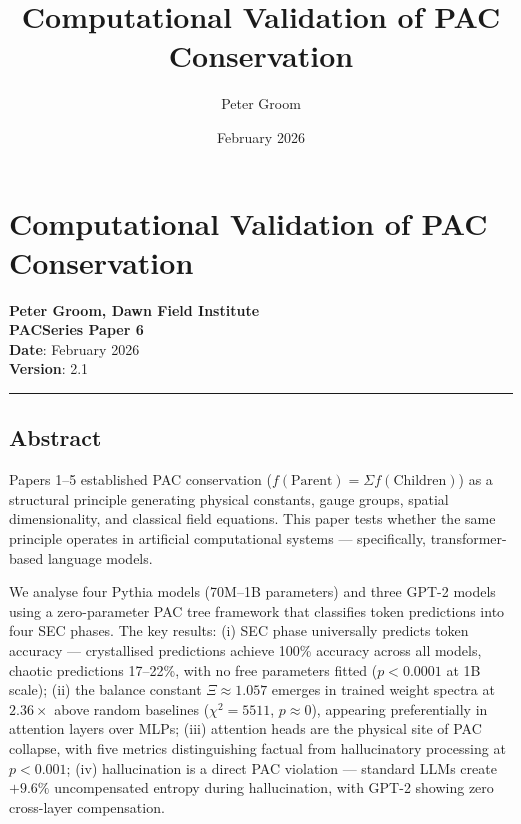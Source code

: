 \documentclass[
  11pt,
  a4paper]{article}
\title{Computational Validation of PAC Conservation}
\author{Peter Groom}
\date{February 2026}
\begin{document}
\maketitle

\renewcommand*\contentsname{Contents}
{
\setcounter{tocdepth}{3}
\tableofcontents
}
\section{Computational Validation of PAC
Conservation}\label{computational-validation-of-pac-conservation}

\textbf{Peter Groom, Dawn Field Institute}\\
\textbf{PACSeries Paper 6}\\
\textbf{Date}: February 2026\\
\textbf{Version}: 2.1

\begin{center}\rule{0.5\linewidth}{0.5pt}\end{center}

\subsection{Abstract}\label{abstract}

Papers 1--5 established PAC conservation
(\(f(\text{Parent}) = \Sigma f(\text{Children})\)) as a structural
principle generating physical constants, gauge groups, spatial
dimensionality, and classical field equations. This paper tests whether
the same principle operates in artificial computational systems ---
specifically, transformer-based language models.

We analyse four Pythia models (70M--1B parameters) and three GPT-2
models using a zero-parameter PAC tree framework that classifies token
predictions into four SEC phases. The key results: (i) SEC phase
universally predicts token accuracy --- crystallised predictions achieve
100\% accuracy across all models, chaotic predictions 17--22\%, with no
free parameters fitted (\(p < 0.0001\) at 1B scale); (ii) the balance
constant \(\Xi \approx 1.057\) emerges in trained weight spectra at
\(2.36\times\) above random baselines (\(\chi^2 = 5511\),
\(p \approx 0\)), appearing preferentially in attention layers over
MLPs; (iii) attention heads are the physical site of PAC collapse, with
five metrics distinguishing factual from hallucinatory processing at
\(p < 0.001\); (iv) hallucination is a direct PAC violation --- standard
LLMs create \(+9.6\%\) uncompensated entropy during hallucination, with
GPT-2 showing zero cross-layer compensation.
\end{document}
